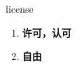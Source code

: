 
\begin{frame}
{\huge license}
\begin{center}
\begin{enumerate}\Large
  \item \textbf{许可，认可}
  \item \textbf{自由}
\end{enumerate}
\end{center}
\end{frame}
